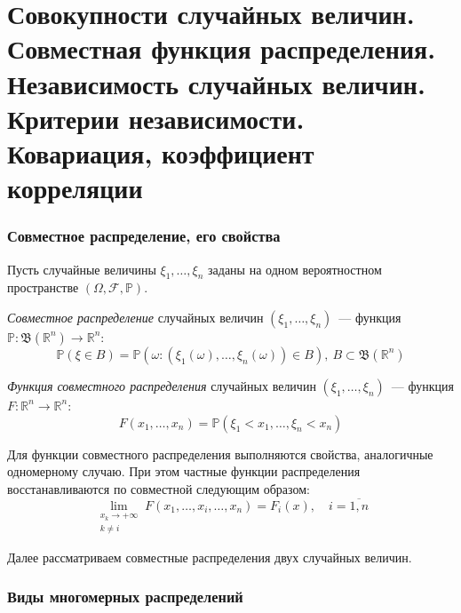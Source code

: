 \section{Совокупности случайных величин. Совместная функция распределения. Независимость случайных величин. Критерии независимости. Ковариация, коэффициент корреляции}

\subsubsection{Совместное распределение, его свойства}

Пусть случайные величины $\xi_1, \ldots, \xi_n$ заданы на одном вероятностном пространстве $(\Omega, \mathcal{F}, \mathbb{P})$.
\begin{defn}
    {\it Совместное распределение} случайных величин $(\xi_1, \ldots, \xi_n)$~--- функция $\mathbb{P}: \mathfrak{B}(\mathbb{R}^{n}) \to \mathbb{R}^{n}$:
    \begin{equation*}
        \mathbb{P}(\xi \in B) = \mathbb{P}(\omega \colon (\xi_{1}(\omega), \ldots, \xi_{n}(\omega)) \in B),~ B \subset \mathfrak{B}(\mathbb{R}^{n})
    \end{equation*}
\end{defn}
\begin{defn}
    {\it Функция совместного распределения} случайных величин $(\xi_1, \ldots, \xi_n)$~--- функция $F: \mathbb{R}^{n} \to \mathbb{R}^{n}$:
    \begin{equation*}
        F(x_{1}, \ldots, x_{n})=\mathbb{P}(\xi_{1}<x_{1}, \ldots, \xi_{n}<x_{n})
    \end{equation*}
\end{defn}

\begin{rmrk}
    Для функции совместного распределения выполняются свойства, аналогичные одномерному случаю. При этом частные функции распределения восстанавливаются по совместной следующим образом:
    \begin{equation*}
        \lim_{\substack{x_{k} \to +\infty \\ k \neq i}}  F(x_{1}, \ldots, x_{i}, \ldots, x_{n}) = F_{i}(x), \quad i = \overline{1,n}
    \end{equation*}
\end{rmrk}
Далее рассматриваем совместные распределения двух случайных величин.

\subsubsection{Виды многомерных распределений}

